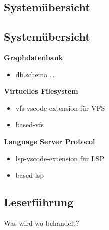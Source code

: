 \subsection{Systemübersicht}

\subsection{Systemübersicht}

\textbf{Graphdatenbank}
\begin{itemize}
	\item db.schema …
\end{itemize}

\textbf{Virtuelles Filesystem}
\begin{itemize}
	\item vfs-vscode-extension für VFS
	\item based-vfs
\end{itemize}

\textbf{Language Server Protocol}
\begin{itemize}
	\item lsp-vscode-extension für LSP
	\item based-lsp
\end{itemize}

\subsection{Leserführung}
Was wird wo behandelt?